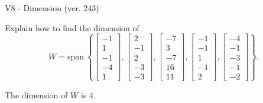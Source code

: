 \begin{exercise}
  \begin{exerciseTitle}V8 - Dimension (ver. 243)\end{exerciseTitle}
  \begin{exerciseStatement}
    Explain how to find the dimension of 
\[W=\mathrm{span}\ \left\{\left[\begin{array}{r}
-1 \\
1 \\
-1 \\
-4 \\
1
\end{array}\right] , \left[\begin{array}{r}
2 \\
-1 \\
2 \\
-3 \\
-3
\end{array}\right] , \left[\begin{array}{r}
-7 \\
3 \\
-7 \\
16 \\
11
\end{array}\right] , \left[\begin{array}{r}
-1 \\
-1 \\
1 \\
-1 \\
2
\end{array}\right] , \left[\begin{array}{r}
-4 \\
-1 \\
-3 \\
-1 \\
-2
\end{array}\right]\right\}.\]



  \end{exerciseStatement}
  \begin{exerciseAnswer}
   The dimension of \(W\) is  \(4\).
  


  \end{exerciseAnswer}
\end{exercise}